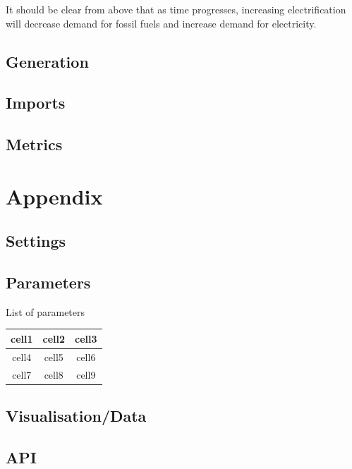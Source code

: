 \documentclass[notitlepage,a4paper]{article}
\begin{document}
It should be clear from above that as time progresses, increasing electrification will decrease demand for fossil fuels and increase demand for electricity.

\subsection{Generation}

\subsection{Imports}

\subsection{Metrics}


\appendix

\section{Appendix}


\subsection{Settings}

\subsection{Parameters}
\label{app:prm1}

List of parameters

\begin{table}[h!]
\begin{center}
\begin{tabular}{ccc}
 cell1 & cell2 & cell3 \\ 
 \hline
 cell4 & cell5 & cell6 \\  
 cell7 & cell8 & cell9    
\end{tabular}
\end{center}
\end{table}



\subsection{Visualisation/Data}


\subsection{API}
\end{document}
